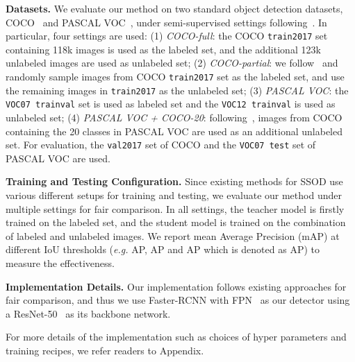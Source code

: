 \documentclass[letterpaper]{article} \usepackage{aaai22}  \usepackage{times}  \usepackage{helvet}  \usepackage{courier}  \usepackage[hyphens]{url}  \usepackage{graphicx} \urlstyle{rm} \def\UrlFont{\rm}  \usepackage{natbib}  \usepackage{caption} \DeclareCaptionStyle{ruled}{labelfont=normalfont,labelsep=colon,strut=off} \frenchspacing  \setlength{\pdfpagewidth}{8.5in}  \setlength{\pdfpageheight}{11in}  \usepackage{algorithm}
\makeatletter
\newcommand*{\eg}{\emph{e.g.}\@\xspace}
\makeatother
\begin{document}
\noindent\textbf{Datasets.} We evaluate our method on two standard object detection datasets, COCO~\cite{coco} and PASCAL VOC~\cite{voc}, under semi-supervised settings following~\cite{csd,stac,unbiasedteacher,instantteaching,ismt}. In particular, four settings are used: (1) \emph{COCO-full}: the COCO \texttt{train2017} set containing 118k images is used as the labeled set, and the additional 123k unlabeled images are used as unlabeled set; (2) \emph{COCO-partial}: we follow~\cite{stac} and randomly sample  images from COCO \texttt{train2017} set as the labeled set, and use the remaining images in \texttt{train2017} as the unlabeled set; (3) \emph{PASCAL VOC}: the \texttt{VOC07 trainval} set is used as labeled set and the \texttt{VOC12 trainval} is used as unlabeled set; (4) \emph{PASCAL VOC + COCO-20}: following~\cite{stac}, images from COCO containing the 20 classes in PASCAL VOC are used as an additional unlabeled set. For evaluation, the \texttt{val2017} set of COCO and the \texttt{VOC07 test} set of PASCAL VOC are used.

\noindent\textbf{Training and Testing Configuration.} Since existing methods for SSOD use various different setups for training and testing, we evaluate our method under multiple settings for fair comparison. In all settings, the teacher model is firstly trained on the  labeled set, and the student model is trained on the combination of labeled and unlabeled images. We report mean Average Precision (mAP) at different IoU thresholds (\eg AP, AP and AP which is denoted as AP) to measure the effectiveness. 



\noindent\textbf{Implementation Details.} Our implementation follows existing approaches for fair comparison, and thus we use Faster-RCNN with FPN~\cite{fpn} as our detector using a ResNet-50~\cite{resnet} as its backbone network. 




For more details of the implementation such as choices of hyper parameters and training recipes, we refer readers to Appendix.
\end{document}
